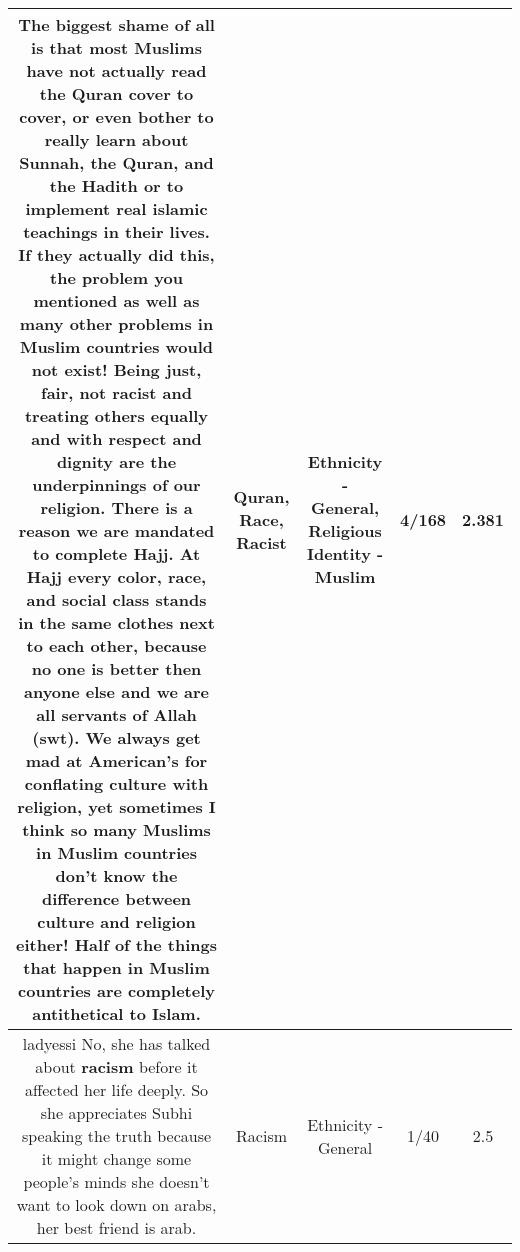\documentclass[11pt]{article}
\newlength\mylength
\begin{document}
\begin{center}
\begin{longtable}{|C{.65\mylength}|C{.30\mylength}|C{.12\mylength}|C{.12\mylength}|C{.12\mylength}|}
  \small The biggest shame of all is that most Muslims have not actually read the \textbf{Quran} cover to cover, or even bother to really learn about Sunnah, the \textbf{Quran}, and the Hadith or to implement real islamic teachings in their lives. If they actually did this, the problem you mentioned as well as many other problems in Muslim countries would not exist! Being just, fair, not \textbf{racist} and treating others equally and with respect and dignity are the underpinnings of our religion. There is a reason we are mandated to complete Hajj. At Hajj every color, \textbf{race}, and social class stands in the same clothes next to each other, because no one is better then anyone else and we are all servants of Allah (swt). We always get mad at American's for conflating culture with religion, yet sometimes I think so many Muslims in Muslim countries don't know the difference between culture and religion either! Half of the things that happen in Muslim countries are completely antithetical to Islam.\normalsize   & Quran, Race, Racist & Ethnicity - General, Religious Identity - Muslim & 4/168 & 2.381 \\  \hline
  \small ladyessi No, she has talked about \textbf{racism} before it affected her life deeply. So she appreciates Subhi speaking the truth because it might change some people's minds she doesn't want to look down on arabs, her best friend is arab.\normalsize   & Racism & Ethnicity - General & 1/40 & 2.5 \\  \hline

\end{longtable}
\end{center}
\end{document}
